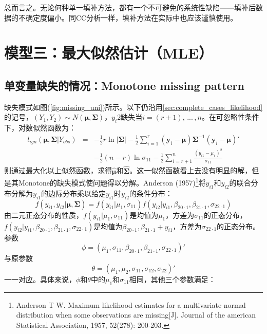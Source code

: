 \documentclass[aps,pre,12pt,preprint,onecolumn,showpacs,showkeys,AutoFakeBold]{revtex4-1}
\begin{document}
    总而言之。无论何种单一填补方法，都有一个不可避免的系统性缺陷——填补后数据的不确定度偏小。同CC分析一样，填补方法在实际中也应该谨慎使用。


\section{模型三：最大似然估计（MLE）}\label{sec:MLE}
    \subsection{单变量缺失的情况：Monotone missing pattern}\label{sec:monotone_missing}
    缺失模式如图(\ref{fig:missing_uni})所示。以下仍沿用\ref{sec:complete_cases_likelihood}的记号，$(Y_1,Y_2)\sim N(\bm{\mu}, \bm\Sigma)$，$y_i2$缺失当$i= (r+1),\, ...\, , n$。在可忽略性条件下，对数似然函数为：
    \begin{eqnarray}\label{eq:likelihood_missing_uni}
        l_{ign}(\bm{\mu},\bm \Sigma\vert Y_{obs})&=&-\frac{1}{2}r\ln \vert \bm \Sigma \vert -\frac{1}{2}\sum _{i=1}^r(\bm y_i-\bm \mu)\bm \Sigma ^{-1}(\bm y_i -\bm \mu)'\nonumber\\
        &&-\frac{1}{2}(n-r)\ln \sigma_{11} -\frac{1}{2}\sum _{i=r+1}^n \frac{(y_{i1}-\mu _1)^2}{\sigma _{11}}
    \end{eqnarray}
    则通过最大化以上似然函数，求得$\hat {\bm\mu}$和$\hat {\bm\Sigma}$。这一似然函数看上去没有明显的解，但是其Monotone的缺失模式使问题得以分解。Anderson (1957)\footnote{Anderson T W. Maximum likelihood estimates for a multivariate normal distribution when some observations are missing[J]. Journal of the american Statistical Association, 1957, 52(278): 200-203.}将$y_{i1}$和$y_{i2}$的联合分布分解为$y_{i1}$的边际分布乘以给定$y_{i1}$时$y_{i2}$的条件分布：
    \begin{equation}
        f(y_{i1},y_{i2}\vert \bm \mu, \bm \Sigma)=f(y_{i1}\vert \mu _1, \sigma _{11}) f(y_{i2} \vert y_{i1}, \beta _{20\cdot 1}, \beta _{21\cdot 1}, \sigma _{22\cdot 1})
    \end{equation}
    由二元正态分布的性质，$f(y_{i1}\vert \mu _1, \sigma _{11})$是均值为$\mu _1$，方差为$\sigma _{11}$的正态分布，$f(y_{i2} \vert y_{i1}, \beta _{20\cdot 1}, \beta _{21\cdot 1}, \sigma _{22\cdot 1})$是均值为$\beta _{20\cdot 1}, \beta _{21\cdot 1}+ y_{i1}$，方差为$\sigma _{22\cdot 1}$的正态分布。参数
    $$\phi=(\mu_1, \sigma _{11}, \beta _{20\cdot 1},\beta _{21\cdot 1}, \sigma _{22\cdot 1} )'$$
    与原参数
    $$\theta = (\mu _1 , \mu _2, \sigma _{11}, \sigma _{12}, \sigma _{22})'$$
    一一对应。具体来说，$\phi$和$\theta$中的$\mu _1$和$\sigma _{11}$相同，其他三个参数满足：
\end{document}
